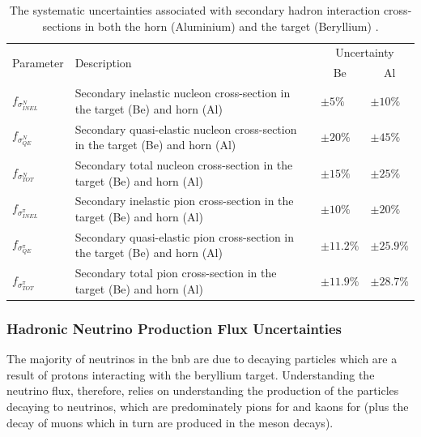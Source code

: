 \begin{table}[!h]
  \renewcommand{\arraystretch}{1.4}    
  \begin{tabular}{p{1.9cm} p{7.8cm} p{1.55cm} p{1.55cm}}
    \toprule
    \multirow{2}{*}{Parameter} & \multirow{2}{*}{Description} & \multicolumn{2}{c}{Uncertainty} \\
    && \multicolumn{1}{c}{Be} & \multicolumn{1}{c}{Al} \\
    \midrule

    $f_{\sigma_{INEL}^{N}}$   & Secondary inelastic nucleon cross-section in the target (Be) and horn (Al) & $\pm 5 \%$ & $\pm 10 \%$\\
                            
    $f_{\sigma_{QE}^{N}}$     & Secondary quasi-elastic nucleon cross-section in the target (Be) and horn (Al) & $\pm 20 \%$ & $\pm 45 \%$\\
                            
    $f_{\sigma_{TOT}^{N}}$    & Secondary total nucleon cross-section in the target (Be) and horn (Al) & $\pm 15 \%$ & $\pm 25 \%$\\

    $f_{\sigma_{INEL}^{\pi}}$ & Secondary inelastic pion cross-section in the target (Be) and horn (Al) & $\pm 10 \% $ & $\pm 20 \% $\\
                          
    $f_{\sigma_{QE}^{\pi}}$   & Secondary quasi-elastic pion cross-section in the target (Be) and horn (Al) & $\pm 11.2 \% $ & $\pm 25.9 \% $\\
                          
    $f_{\sigma_{TOT}^{\pi}}$  & Secondary total pion cross-section in the target (Be) and horn (Al) & $\pm 11.9 \%$ & $\pm 28.7 \%$\\
    \bottomrule
  \end{tabular}
  \caption[Hadronic secondary interaction flux systematic parameters.]{The systematic uncertainties associated with secondary hadron interaction cross-sections in both the horn (Aluminium) and the target (Beryllium) \cite{SBN_Proposal}.}
  \label{table:secondary_hadron_interaction_xsec}
\end{table}

\newpage
\subsubsection*{Hadronic Neutrino Production Flux Uncertainties}
The majority of neutrinos in the \gls{bnb} are due to decaying particles which are a result of protons interacting with the beryllium target. Understanding the neutrino flux, therefore, relies on understanding the production of the particles decaying to neutrinos, which are predominately pions for \numu and kaons for \nue (plus the decay of muons which in turn are produced in the meson decays). 

